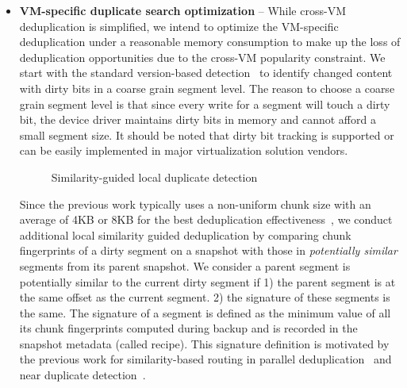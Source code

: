 \begin{itemize}
\item 
\textbf{VM-specific duplicate search optimization} --
While cross-VM deduplication is simplified, we intend to optimize the VM-specific deduplication 
under a reasonable memory consumption
 to make up the loss of deduplication opportunities due to the cross-VM popularity constraint.
We start with the standard version-based detection~\cite{Clements2009,Vrable2009}
to identify changed content with dirty bits in a coarse grain segment level.
The reason to choose a coarse grain segment level is that 
since every write for a segment will touch a dirty bit, the device driver maintains dirty bits in 
memory and cannot afford a small segment size.
It should be noted that dirty bit tracking is supported or can be easily implemented in 
major virtualization solution vendors. 

\begin{figure}[htbp]
  \centering
  \caption{Similarity-guided local duplicate detection}
  \label{fig:local_dedup}
\end{figure}

Since the previous work typically uses a non-uniform chunk size 
with an average of 4KB or 8KB for the best deduplication 
effectiveness~\cite{Guo2011,extreme_binning09,bottleneck08,Dong2011},
we conduct additional local similarity guided deduplication 
by comparing chunk fingerprints of a dirty segment on a snapshot 
with those in  {\em potentially similar} segments from its parent snapshot. 
We consider a parent  segment is  potentially similar to the current dirty segment if 1) the parent segment
is at the same offset as the current segment.
2) the signature of these segments is the same.
The signature of a segment is defined as the minimum value of all its chunk fingerprints 
computed during backup and is recorded in the snapshot metadata (called recipe). 
This signature definition is motivated by the previous work for similarity-based routing in parallel
deduplication~\cite{extreme_binning09,Dong2011} and near duplicate detection~\cite{shingling97}. 




\end{itemize}
